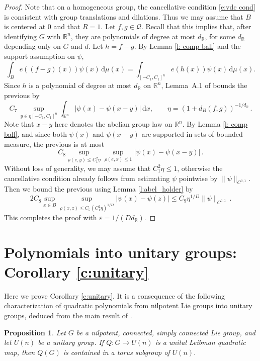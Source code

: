 \documentclass[12pt,reqno,a4paper,dvipsnames]{amsart}
\theoremstyle{plain}
\newtheorem{prop}[theorem]{Proposition}
\theoremstyle{definition}
\numberwithin{theorem}{section}
\numberwithin{equation}{section}
\newcommand{\R}{\mathbb{R}}
\newcommand{\AD}{D}
\begin{document}
\begin{proof}
Note that on a homogeneous group, the cancellative condition \eqref{e:vdc cond} is consistent with group translations and dilations. Thus we may assume that $B$ is centered at $0$ and that $R = 1$.
Let $f,g \in \mathcal{Q}$. Recall that this implies that, after identifying $G$ with $\R^n$, they are polynomials of degree at most $d_\R$, for some $d_\R$ depending only on $G$ and $d$. Let $h = f - g$. By Lemma \ref{l: comp ball} and the support assumption on $\psi$,
\[
    \int_B e((f-g)(x)) \psi(x) \, \mathrm{d}\mu(x) = \int_{[-C_1, C_1]^n} e(h(x)) \psi(x) \, \mathrm{d}\mu(x).
\]
Since $h$ is a polynomial of degree at most $d_\R$ on $\R^n$, Lemma~A.1 of \cite{zk-polynomial} bounds the previous by
\[
     C_7 \, \sup_{y \in \eta [-C_1, C_1]^n} \int_{\R^n} |\psi(x) - \psi(x-y)| \, \mathrm{d}x, \qquad \eta = (1 + d_B(f,g))^{-1/d_\R}\,.
\]
Note that $x-y$ here denotes the abelian group law on $\R^n$. 
By Lemma \ref{l: comp ball}, and since both $\psi(x)$ and $\psi(x-y)$ are supported in sets of bounded measure, the previous is at most
\[
     C_8   \sup_{\rho(e,y) \le C_1^2 \eta} \sup_{\rho(e,x) \le 1} |\psi(x) - \psi(x- y)|\,.
\]
Without loss of generality, we may assume that $C_1^2 \eta \le 1$, otherwise the cancellative condition already follows from estimating $\psi$ pointwise by $\|\psi\|_{C^{0,1}}$. Then we  bound the previous using Lemma \ref{l:abel_holder} by
\[
    2C_8 \sup_{x \in B} \sup_{\rho(x,z) \le C_5 (C_1^2\eta)^{1/\AD}} |\psi(x) - \psi(z)| \le C_9 \eta^{1/\AD} \|\psi\|_{C^{0,1}}\,.
\]
This completes the proof with $\varepsilon = 1/(\AD d_\R)$. 
\end{proof}


\section{Polynomials into unitary groups: Corollary \ref{c:unitary}}

\label{s:quadratic}

Here we prove Corollary \ref{c:unitary}. It is a consequence of the following characterization of quadratic polynomials from nilpotent Lie groups into unitary groups, deduced from the main result of \cite{quadratic}.

\begin{prop}\label{p:abelian}
Let $G$ be a nilpotent, connected, simply connected Lie group, and let $U(n)$ be a unitary group. 
If $Q\colon G\to U(n)$ is a unital Leibman quadratic map, then $Q(G)$ is contained in a torus subgroup of $U(n)$.
\end{prop}
\end{document}
